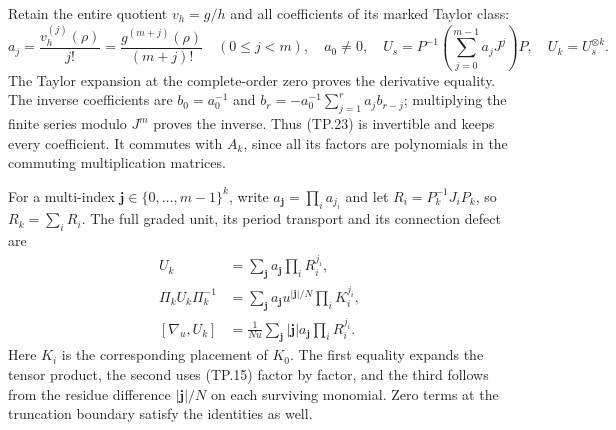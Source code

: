Retain the entire quotient \(v_h=g/h\) and all coefficients
of its marked Taylor class:
\[
 a_j=\frac{v_h^{(j)}(\rho)}{j!}
     =\frac{g^{(m+j)}(\rho)}{(m+j)!}\quad(0\leq j<m),
 \quad a_0\ne0,\quad
 U_s=P^{-1}\left(\sum_{j=0}^{m-1}a_jJ^j\right)P,
 \quad U_k=U_s^{\otimes k}.
 \tag{TP.23}\label{eq:tp-unit}
\]
The Taylor expansion at the complete-order zero proves
the derivative equality. The inverse coefficients are
\(b_0=a_0^{-1}\) and
\(b_r=-a_0^{-1}\sum_{j=1}^ra_jb_{r-j}\); multiplying
the finite series modulo \(J^m\) proves the inverse.
Thus (TP.23) is invertible and keeps every coefficient.
It commutes with \(A_k\), since all its factors are
polynomials in the commuting multiplication matrices.

For a multi-index \(\mathbf j\in\{0,\ldots,m-1\}^k\),
write \(a_{\mathbf j}=\prod_i a_{j_i}\) and let
\(R_i=P_k^{-1}J_iP_k\), so \(R_k=\sum_iR_i\).
The full graded unit, its period transport and its
connection defect are
\[
 \begin{split}
 U_k&=\sum_{\mathbf j}a_{\mathbf j}\prod_iR_i^{j_i},\\
 \Pi_kU_k\Pi_k^{-1}
   &=\sum_{\mathbf j}a_{\mathbf j}u^{|\mathbf j|/N}
                              \prod_iK_i^{j_i},\\
 [\nabla_u,U_k]
   &=\frac1{Nu}\sum_{\mathbf j}|\mathbf j|a_{\mathbf j}
                              \prod_iR_i^{j_i}.
 \end{split}
 \tag{TP.24}\label{eq:tp-unittransport}
\]
Here \(K_i\) is the corresponding placement of \(K_0\).
The first equality expands the tensor product, the
second uses (TP.15) factor by factor, and the third
follows from the residue difference \(|\mathbf j|/N\)
on each surviving monomial. Zero terms at the truncation
boundary satisfy the identities as well.

